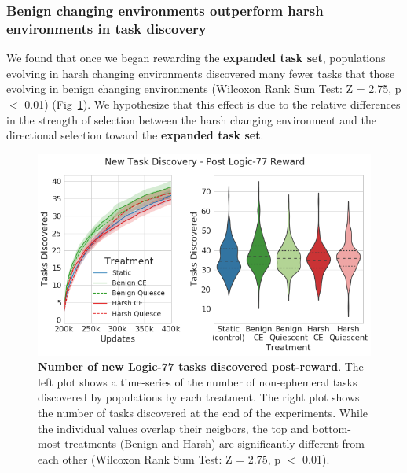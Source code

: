 \documentclass[10pt,letterpaper]{article}
\begin{document}
\subsubsection*{Benign changing environments outperform harsh environments in task discovery}
We found that once we began rewarding the \textbf{expanded task set}, populations evolving in harsh changing environments discovered many fewer tasks that those evolving in benign changing environments (Wilcoxon Rank Sum Test: Z = 2.75, p $<$ 0.01) (Fig~\ref{fig:postreward_task_discovery}). We hypothesize that this effect is due to the relative differences in the strength of selection between the harsh changing environment and the directional selection toward the \textbf{expanded task set}. 
	\begin{figure}[!h]
	\includegraphics[width=0.95\columnwidth]{figures/LTE/lte-simple-post_reward_task_discovery.png}
	\caption{\textbf{Number of new Logic-77 tasks discovered post-reward}. The left plot shows a time-series of the number of non-ephemeral tasks discovered by populations by each treatment. The right plot shows the number of tasks discovered at the end of the experiments. While the individual values overlap their neigbors, the top and bottom-most treatments (Benign and Harsh) are significantly different from each other (Wilcoxon Rank Sum Test: Z = 2.75, p $<$ 0.01). %
	}
	\label{fig:postreward_task_discovery}
	\end{figure} 
\end{document}
